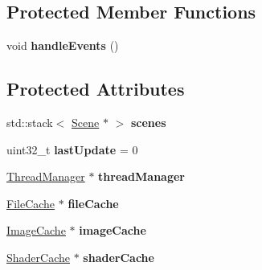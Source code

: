 \subsection*{Protected Member Functions}
\begin{DoxyCompactItemize}
\item 
\mbox{\label{classsage_1_1Application_a560aab587a90a1501eeee97160b09c3d}} 
void {\bfseries handle\+Events} ()
\end{DoxyCompactItemize}
\subsection*{Protected Attributes}
\begin{DoxyCompactItemize}
\item 
\mbox{\label{classsage_1_1Application_a684050e1d1b3033c9226c2a3481f934d}} 
std\+::stack$<$ \mbox{\hyperlink{classsage_1_1Scene}{Scene}} $\ast$ $>$ {\bfseries scenes}
\item 
\mbox{\label{classsage_1_1Application_a08facf4df89e707b2a07a1be0782643a}} 
uint32\+\_\+t {\bfseries last\+Update} = 0
\item 
\mbox{\label{classsage_1_1Application_a246cb87d276d2ee0ca471379307bc456}} 
\mbox{\hyperlink{classsage_1_1ThreadManager}{Thread\+Manager}} $\ast$ {\bfseries thread\+Manager}
\item 
\mbox{\label{classsage_1_1Application_ab576f71a5b927d4b7f7790ae0b15c213}} 
\mbox{\hyperlink{classsage_1_1FileCache}{File\+Cache}} $\ast$ {\bfseries file\+Cache}
\item 
\mbox{\label{classsage_1_1Application_ab335f3e9f82d3648878128a75caeb89b}} 
\mbox{\hyperlink{classsage_1_1ImageCache}{Image\+Cache}} $\ast$ {\bfseries image\+Cache}
\item 
\mbox{\label{classsage_1_1Application_adc39fae2de148d3c726b86d0c93a4816}} 
\mbox{\hyperlink{classsage_1_1ShaderCache}{Shader\+Cache}} $\ast$ {\bfseries shader\+Cache}
\item 
\mbox{\label{classsage_1_1Application_a998309542a632e444d9a7d9ef6e5d5bf}} 

\end{DoxyCompactItemize}
